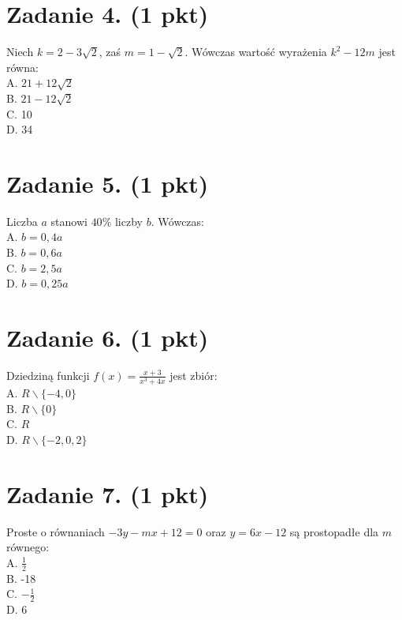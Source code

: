 \documentclass[10pt]{article}
\begin{document}
\section*{Zadanie 4. (1 pkt)}
Niech \(k=2-3 \sqrt{2}\), zaś \(m=1-\sqrt{2}\). Wówczas wartość wyrażenia \(k^{2}-12 m\) jest równa:\\
A. \(21+12 \sqrt{2}\)\\
B. \(21-12 \sqrt{2}\)\\
C. 10\\
D. 34

\section*{Zadanie 5. (1 pkt)}
Liczba \(a\) stanowi \(40 \%\) liczby \(b\). Wówczas:\\
A. \(b=0,4 a\)\\
B. \(b=0,6 a\)\\
C. \(b=2,5 a\)\\
D. \(b=0,25 a\)

\section*{Zadanie 6. (1 pkt)}
Dziedziną funkcji \(f(x)=\frac{x+3}{x^{3}+4 x}\) jest zbiór:\\
A. \(R \backslash\{-4,0\}\)\\
B. \(R \backslash\{0\}\)\\
C. \(R\)\\
D. \(R \backslash\{-2,0,2\}\)

\section*{Zadanie 7. (1 pkt)}
Proste o równaniach \(-3 y-m x+12=0\) oraz \(y=6 x-12\) są prostopadłe dla \(m\) równego:\\
A. \(\frac{1}{2}\)\\
B. -18\\
C. \(-\frac{1}{2}\)\\
D. 6
\end{document}
